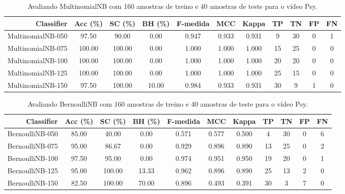 \begin{table}[!htb]
\centering
\caption{Avaliando MultinomialNB com 160 amostras de treino e 40 amostras de teste para o vídeo Psy.}
\label{tab:multinomial-nb-Psy}
\begin{tabular}{r|c|c|c|c|c|c|c|c|c|c}
\hline\hline
Classifier & Acc (\%) & SC (\%) & BH (\%) & F-medida & MCC & Kappa & TP & TN & FP & FN \\ \hline
MultinomialNB-050 & 97.50 & 90.00 & 0.00 & 0.947 & 0.933 & 0.931 & 9 & 30 & 0 & 1 \\ 
MultinomialNB-075 & 100.00 & 100.00 & 0.00 & 1.000 & 1.000 & 1.000 & 15 & 25 & 0 & 0 \\ 
MultinomialNB-100 & 100.00 & 100.00 & 0.00 & 1.000 & 1.000 & 1.000 & 20 & 20 & 0 & 0 \\ 
MultinomialNB-125 & 100.00 & 100.00 & 0.00 & 1.000 & 1.000 & 1.000 & 25 & 15 & 0 & 0 \\ 
MultinomialNB-150 & 97.50 & 100.00 & 10.00 & 0.984 & 0.933 & 0.931 & 30 & 9 & 1 & 0 \\ 
\hline\hline
\end{tabular}
\end{table}
\begin{table}[!htb]
\centering
\caption{Avaliando BernoulliNB com 160 amostras de treino e 40 amostras de teste para o vídeo Psy.}
\label{tab:bernoulli-nb-Psy}
\begin{tabular}{r|c|c|c|c|c|c|c|c|c|c}
\hline\hline
Classifier & Acc (\%) & SC (\%) & BH (\%) & F-medida & MCC & Kappa & TP & TN & FP & FN \\ \hline
BernoulliNB-050 & 85.00 & 40.00 & 0.00 & 0.571 & 0.577 & 0.500 & 4 & 30 & 0 & 6 \\ 
BernoulliNB-075 & 95.00 & 86.67 & 0.00 & 0.929 & 0.896 & 0.890 & 13 & 25 & 0 & 2 \\ 
BernoulliNB-100 & 97.50 & 95.00 & 0.00 & 0.974 & 0.951 & 0.950 & 19 & 20 & 0 & 1 \\ 
BernoulliNB-125 & 95.00 & 100.00 & 13.33 & 0.962 & 0.896 & 0.890 & 25 & 13 & 2 & 0 \\ 
BernoulliNB-150 & 82.50 & 100.00 & 70.00 & 0.896 & 0.493 & 0.391 & 30 & 3 & 7 & 0 \\ 
\hline\hline
\end{tabular}
\end{table}

